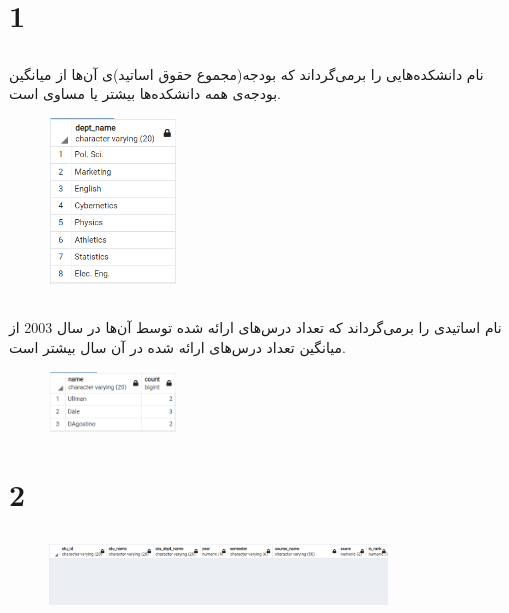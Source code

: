 \documentclass{article}
\begin{document}


\newpage


\section{1}
\subsection{}
نام دانشکده‌هایی را برمی‌گرداند که بودجه(مجموع حقوق اساتید)ی آن‌ها از میانگین بودجه‌ی همه دانشکده‌ها بیشتر یا مساوی است.
\begin{figure}[H]
    \centering
    \includegraphics[width=0.3\textwidth]{figures/1-a.png}
    \caption
	{
	}
    \label{fig:fig1}
\end{figure}

\subsection{}
نام اساتیدی را بر‌می‌گرداند که تعداد درس‌های ارائه شده توسط آن‌ها در سال 2003 از میانگین تعداد درس‌های ارائه شده در آن سال بیشتر است.
\begin{figure}[H]
    \centering
    \includegraphics[width=0.3\textwidth]{figures/1-b.png}
    \caption
	{
	}
    \label{fig:fig1}
\end{figure}


\section{2}
\subsection{}
\begin{figure}[H]
    \centering
    \includegraphics[width=0.8\textwidth]{figures/2-a.png}
    \caption
	{
	}
    \label{fig:fig1}
\end{figure}
\end{document}
